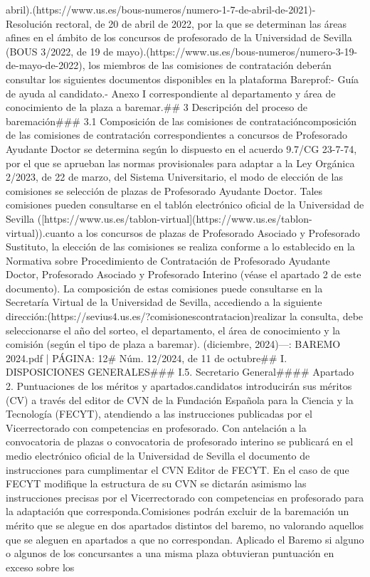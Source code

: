 \documentclass{article}
\begin{document}
\begin{itemize}
{{{{{{{{abril).(https://www.us.es/bous-numeros/numero-1-7-de-abril-de-2021)\n\n- Resolución rectoral, de 20 de abril de 2022, por la que se determinan las áreas afines en el ámbito de los concursos de profesorado de la Universidad de Sevilla (BOUS 3/2022, de 19 de mayo).(https://www.us.es/bous-numeros/numero-3-19-de-mayo-de-2022)\n\nAsimismo, los miembros de las comisiones de contratación deberán consultar los siguientes documentos disponibles en la plataforma Bareprof:\n- Guía de ayuda al candidato.\n- Anexo I correspondiente al departamento y área de conocimiento de la plaza a baremar.\n\n## 3 Descripción del proceso de baremación\n\n### 3.1 Composición de las comisiones de contratación\n\nLa composición de las comisiones de contratación correspondientes a concursos de Profesorado Ayudante Doctor se determina según lo dispuesto en el acuerdo 9.7/CG 23-7-74, por el que se aprueban las normas provisionales para adaptar a la Ley Orgánica 2/2023, de 22 de marzo, del Sistema Universitario, el modo de elección de las comisiones se selección de plazas de Profesorado Ayudante Doctor. Tales comisiones pueden consultarse en el tablón electrónico oficial de la Universidad de Sevilla ([https://www.us.es/tablon-virtual](https://www.us.es/tablon-virtual)).\n\nEn cuanto a los concursos de plazas de Profesorado Asociado y Profesorado Sustituto, la elección de las comisiones se realiza conforme a lo establecido en la Normativa sobre Procedimiento de Contratación de Profesorado Ayudante Doctor, Profesorado Asociado y Profesorado Interino (véase el apartado 2 de este documento). La composición de estas comisiones puede consultarse en la Secretaría Virtual de la Universidad de Sevilla, accediendo a la siguiente dirección:(https://sevius4.us.es/?comisionescontratacion)\n\nPara realizar la consulta, debe seleccionarse el año del sorteo, el departamento, el área de conocimiento y la comisión (según el tipo de plaza a baremar).\n{} (diciembre, 2024)\n\n---\n\nFUENTE: BAREMO 2024.pdf | PÁGINA: 12\n# Núm. 12/2024, de 11 de octubre\n\n## I. DISPOSICIONES GENERALES\n\n### I.5. Secretario General\n\n#### Apartado 2. Puntuaciones de los méritos y apartados.\n\nLos candidatos introducirán sus méritos (CV) a través del editor de CVN de la Fundación Española para la Ciencia y la Tecnología (FECYT), atendiendo a las instrucciones publicadas por el Vicerrectorado con competencias en profesorado. Con antelación a la convocatoria de plazas o convocatoria de profesorado interino se publicará en el medio electrónico oficial de la Universidad de Sevilla el documento de instrucciones para cumplimentar el CVN Editor de FECYT. En el caso de que FECYT modifique la estructura de su CVN se dictarán asimismo las instrucciones precisas por el Vicerrectorado con competencias en profesorado para la adaptación que corresponda.\n\nLas Comisiones podrán excluir de la baremación un mérito que se alegue en dos apartados distintos del baremo, no valorando aquellos que se aleguen en apartados a que no correspondan. Aplicado el Baremo si alguno o algunos de los concursantes a una misma plaza obtuvieran puntuación en exceso sobre los }}}}}}}}
\end{itemize}
\end{document}

